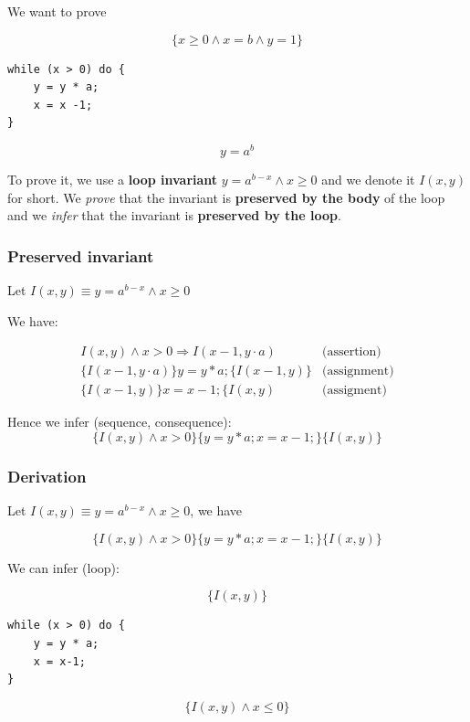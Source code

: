 \documentclass[12pt, a4paper]{book}
\begin{document}
    We want to prove

    \begin{center}
    $$\{ x \ge 0 \land x = b \land y =1 \}$$
    \begin{minipage}{0.3\linewidth}
\begin{lstlisting}
while (x > 0) do {
    y = y * a;
    x = x -1;
}
\end{lstlisting}
    \end{minipage}
    $$y = {a}^{b}$$
    \end{center}

    To prove it, we use a \textbf{loop invariant} $y = {a}^{b-x} \land x \ge 0$
    and we denote it $I(x,y)$ for short. We \textit{prove} that the invariant
    is \textbf{preserved by the body} of the loop and we \textit{infer} that
    the invariant is \textbf{preserved by the loop}.

    \subsubsection{Preserved invariant}

    Let $I(x,y) \equiv y = {a}^{b-x} \land x \ge 0$ \newline

    We have:

    \begin{eqnarray*}
        I(x,y) \land x > 0 \Rightarrow I(x-1, y \cdot a) & \textrm{(assertion)} \\
        \{ I(x-1, y \cdot a) \} y = y * a; \{ I(x-1, y) \} & \textrm{(assignment)} \\
        \{ I(x-1, y) \} x = x - 1; \{ I(x,y) & \textrm{(assigment)}
    \end{eqnarray*}

    Hence we infer (sequence, consequence):
    $$
    \{ I(x,y) \land x > 0 \} \{ y = y*a; x=x-1; \} \{ I(x,y) \}
    $$

    \subsubsection{Derivation}

    Let $I(x,y) \equiv y = {a}^{b-x} \land x \ge 0$, we have

    $$
    \{ I(x,y) \land x > 0 \} \{ y=y*a; x=x-1; \} \{ I(x,y) \}
    $$

    \bigskip
    We can infer (loop):

    \begin{minipage}{\linewidth}
        \begin{minipage}[c]{0.3\linewidth}
            $$\{ I(x,y) \}$$
        \end{minipage}
        \begin{minipage}[c]{0.3\linewidth}
            \centering
\begin{lstlisting}
while (x > 0) do {
    y = y * a;
    x = x-1;
}
\end{lstlisting}
        \end{minipage}
        \begin{minipage}[c]{0.3\linewidth}
            $$\{ I(x,y) \land x \le 0 \}$$
        \end{minipage}
    \end{minipage}
\end{document}
